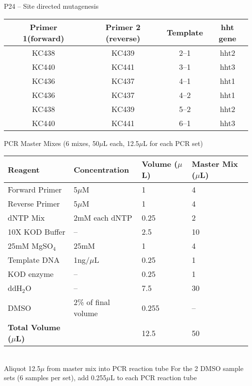 \documentclass[a4paper,10pt]{article}
\begin{document}

{\centering \Large{P24 -- Site directed mutagenesis}

}

\noindent\begin{tabular}{|c|c|c|c|}
\hline
\textbf{Primer 1(forward)} & \textbf{Primer 2 (reverse)} & \textbf{Template} & \textbf{hht gene}\\
\hline
KC438 & KC439 & 2--1 & hht2\\
\hline
KC440 & KC441 & 3--1 & hht3\\
\hline
KC436 & KC437 & 4--1 & hht1\\
\hline
KC436 & KC437 & 4--2 & hht1\\
\hline
KC438 & KC439 & 5--2 & hht2\\
\hline
KC440 & KC441 & 6--1 & hht3\\
\hline
\end{tabular}

\noindent PCR Master Mixes (6 mixes, 50$\mu$L each, 12.5$\mu$L for each PCR set)\\
\begin{tabular}{|l|l|l|l|}
\hline
\textbf{Reagent} & \textbf{Concentration} & \textbf{Volume ($\mu$L)} & \textbf{Master Mix ($\mu$L)}\\
\hline
Forward Primer & 5$\mu$M & 1 & 4\\
\hline
Reverse Primer & 5$\mu$M & 1 & 4\\
\hline
dNTP Mix & 2mM each dNTP & 0.25 & 2\\
\hline
10X KOD Buffer & -- & 2.5 & 10\\
\hline
25mM MgSO$_4$ & 25mM & 1 & 4\\
\hline
Template DNA & 1ng/$\mu$L & 0.25 & 1\\
\hline
KOD enzyme & -- & 0.25 & 1\\
\hline
ddH$_2$O & -- & 7.5 & 30\\
\hline
DMSO & 2\% of final volume & 0.255 & --\\
\hline
\textbf{Total Volume ($\mu$L)} & & 12.5 &50\\
\hline
\end{tabular}\vspace{1em}\\
Aliquot 12.5$\mu$ from master mix into PCR reaction tube
For the 2 DMSO sample sets (6 samples per set), add 0.255$\mu$L to each PCR reaction tube
\end{document}
